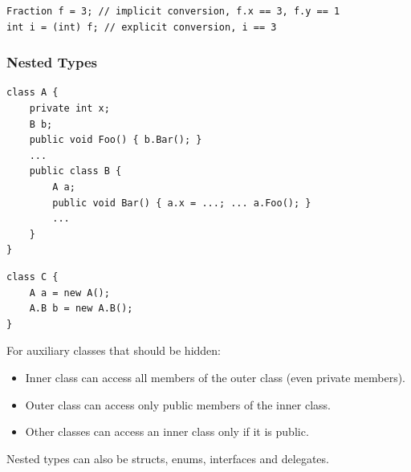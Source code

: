 \begin{lstlisting}
Fraction f = 3; // implicit conversion, f.x == 3, f.y == 1
int i = (int) f; // explicit conversion, i == 3
\end{lstlisting}

\subsubsection{Nested Types}
\begin{multicols}{2}
\begin{lstlisting}
class A {
	private int x;
	B b;
	public void Foo() { b.Bar(); }
	...
	public class B {
		A a;
		public void Bar() { a.x = ...; ... a.Foo(); }
		...
	}
}
\end{lstlisting}
\columnbreak
\begin{lstlisting}
class C {
	A a = new A();
	A.B b = new A.B();
}
\end{lstlisting}
\end{multicols}

For auxiliary classes that should be hidden:
\begin{itemize}
	\item Inner class can access all members of the outer class (even private members).
	\item Outer class can access only public members of the inner class.
	\item Other classes can access an inner class only if it is public.
\end{itemize}
Nested types can also be structs, enums, interfaces and delegates.


